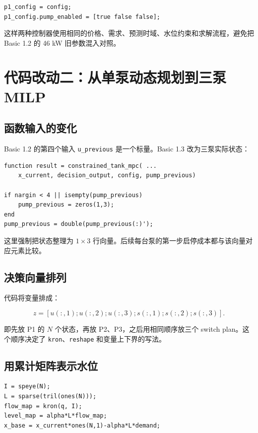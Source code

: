 \documentclass[UTF8,a4paper,11pt]{ctexart}
\newcommand{\code}[1]{\texttt{#1}}
\begin{document}
\begin{lstlisting}
p1_config = config;
p1_config.pump_enabled = [true false false];
\end{lstlisting}

这样两种控制器使用相同的价格、需求、预测时域、水位约束和求解流程，避免把 Basic 1.2 的 46 kW 旧参数混入对照。

\section{代码改动二：从单泵动态规划到三泵 MILP}

\subsection{函数输入的变化}

Basic 1.2 的第四个输入 \code{u\_previous} 是一个标量。Basic 1.3 改为三泵实际状态：

\begin{lstlisting}
function result = constrained_tank_mpc( ...
    x_current, decision_output, config, pump_previous)

if nargin < 4 || isempty(pump_previous)
    pump_previous = zeros(1,3);
end
pump_previous = double(pump_previous(:)');
\end{lstlisting}

这里强制把状态整理为 $1\times3$ 行向量。后续每台泵的第一步启停成本都与该向量对应元素比较。

\subsection{决策向量排列}

代码将变量排成：

\begin{equation}
z=[u(:,1);u(:,2);u(:,3);s(:,1);s(:,2);s(:,3)].
\end{equation}

即先放 P1 的 $N$ 个状态，再放 P2、P3，之后用相同顺序放三个 switch plan。这个顺序决定了 \code{kron}、\code{reshape} 和变量上下界的写法。

\subsection{用累计矩阵表示水位}

\begin{lstlisting}[caption={构造累计质量平衡矩阵}]
I = speye(N);
L = sparse(tril(ones(N)));
flow_map = kron(q, I);
level_map = alpha*L*flow_map;
x_base = x_current*ones(N,1)-alpha*L*demand;
\end{lstlisting}
\end{document}
